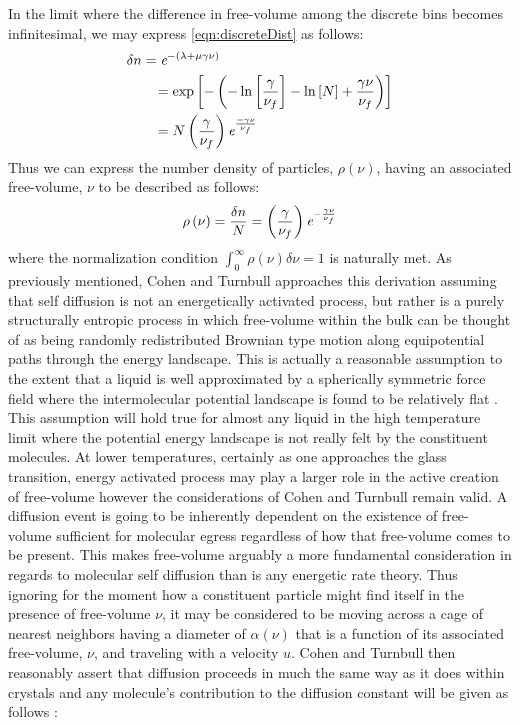 In the limit where the difference in free-volume among the discrete bins becomes infinitesimal, we may express \eqn\nolinebreak \ref{eqn:discreteDist} as follows:
\begin{equation}
	\begin{split}
		&\delta n=\textit{e}^{-\left(\lambda+\mu\gamma\nu\right)}\\
		&\;\;\;\;\;\;\;=\exp\left[{-\left(-\ln\left[\frac{\gamma}{\nu_f}\right]-\ln\left[N\right]+\frac{\gamma\nu}{\nu_f}\right)}\right]\\
		&\;\;\;\;\;\;\;=N\left(\frac{\gamma}{\nu_f}\right)\textit{e}^{\frac{-\gamma\nu}{\nu_f}}
	\end{split}
\end{equation}
Thus we can express the number density of particles, $\rho\left(\nu\right)$, having an associated free-volume, $\nu$ to be described as follows:
\begin{equation}
	\rho\left(\nu\right)=\frac{\delta n}{N}=\left(\frac{\gamma}{\nu_f}\right)\textit{e}^{-\frac{\gamma\nu}{\nu_f}}
	\label{eqn:freeVolumeDistribution}
\end{equation}
where the normalization condition $\int_{0}^{\infty}\rho\left(\nu\right)\delta\nu=1$ is naturally met.  As previously mentioned, Cohen and Turnbull approaches this derivation assuming that self diffusion is not an energetically activated process, but rather is a purely structurally entropic process in which free-volume within the bulk can be thought of as being randomly redistributed \via Brownian type motion along equipotential paths through the energy landscape. This is actually a reasonable assumption to the extent that a liquid is well approximated by a spherically symmetric force field where the intermolecular potential landscape is found to be relatively flat \nolinebreak\cite{Vineyard}.  This assumption will hold true for almost any liquid in the high temperature limit where the potential energy landscape is not really felt by the constituent molecules.  At lower temperatures, certainly as one approaches the glass transition, energy activated process may play a larger role in the active creation of free-volume however the considerations of Cohen and Turnbull remain valid.  A diffusion event is going to be inherently dependent on the existence of free-volume sufficient for molecular egress regardless of how that free-volume comes to be present.  This makes free-volume arguably a more fundamental consideration in regards to molecular self diffusion than is any energetic rate theory. Thus ignoring for the moment how a constituent particle might find itself in the presence of free-volume $\nu$, it may be considered to be moving across a cage of nearest neighbors having a diameter of $\alpha\left(\nu\right)$ that is a function of its associated free-volume, $\nu$, and traveling with a velocity $u$.  Cohen and Turnbull then reasonably assert that diffusion proceeds in much the same way as it does within crystals and any molecule's contribution to the diffusion constant will be given as follows \nolinebreak\cite{Rice}:

